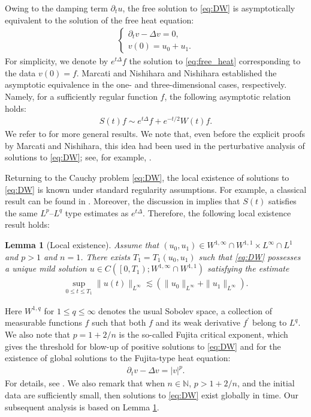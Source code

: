\documentclass[reqno]{amsart}
\newtheorem{Lemma}[Theorem]{Lemma}
\begin{document}
Owing to the damping term $\partial_t u$,
the free solution to \eqref{eq:DW} is
asymptotically equivalent to the solution of the free heat equation:
	\begin{align}
	\begin{cases}
	\partial_t v - \Delta v = 0,\\
	v(0) = u_0 + u_1.
	\end{cases}
	\label{eq:free_heat}
	\end{align}
For simplicity, we denote by $e^{t \Delta} f$
the solution to \eqref{eq:free_heat} corresponding to the data $v(0)=f$.
Marcati and Nishihara \cite{MN03} and Nishihara \cite{N03}
established the asymptotic equivalence
in the one- and three-dimensional cases, respectively.
Namely, for a sufficiently regular function $f$,
the following asymptotic relation holds:
	\begin{align}
	S(t) f
	\sim e^{t \Delta} f + e^{-t/2} W(t) f.
	\label{eq:asymptotic_equivalence}
	\end{align}
We refer to \cite{IIOW19} for more general results.
We note that, even before the explicit proofs by Marcati and Nishihara,
this idea had been used in the perturbative analysis of solutions to \eqref{eq:DW};
see, for example, \cite{LZ95}.

Returning to the Cauchy problem \eqref{eq:DW},
the local existence of solutions to \eqref{eq:DW}
is known under standard regularity assumptions.
For example, a classical result can be found in \cite{s90}.
Moreover, the discussion in \cite{MN03} implies that
$S(t)$ satisfies the same $L^p$–$L^q$ type estimates
as $e^{t \Delta}$.
Therefore, the following local existence result holds:
\begin{Lemma}[Local existence]\label{lemma:local_existence}
Assume that
$(u_0,u_1) \in W^{1,\infty} \cap W^{1,1} \times L^\infty \cap L^1$ and $p > 1$ and $n =1$.
There exists
$T_1=T_1(u_0,u_1)$
such that \eqref{eq:DW} possesses a unique mild solution
$u \in C\left(\left[0, T_1\right) ;W^{1,\infty} \cap W^{1,1}\right)$
satisfying the estimate
	\begin{align}\label{eq2}
	\sup _{0 \leq t \leq T_1} \|u(t) \|_{ L^{\infty}}
	\lesssim ( \|u_0 \|_{L^\infty} + \|u_1 \|_{L^\infty}).
	\end{align}
\end{Lemma}
\noindent
Here
$W^{1,q}$ for $1 \leq q \leq \infty$ denotes the usual Sobolev space,
a collection of measurable functions $f$
such that both $f$ and its weak derivative $f^\prime$
belong to $L^q$.
We also note that $p=1+2/n$ is the so-called Fujita critical exponent,
which gives the threshold for blow-up of positive solutions to \eqref{eq:DW}
and for the existence of global solutions to the Fujita-type heat equation:
	\begin{align}
	\partial_t v - \Delta v = |v|^p.
	\label{eq:fujita_equation}
	\end{align}
For details, see \cite{F66,H73,KST77}.
We also remark that when $n \in \mathbb N$, $p > 1+2/n$,
and the initial data are sufficiently small,
then solutions to \eqref{eq:DW} exist globally in time.
Our subsequent analysis is based on Lemma \ref{lemma:local_existence}.
\end{document}
